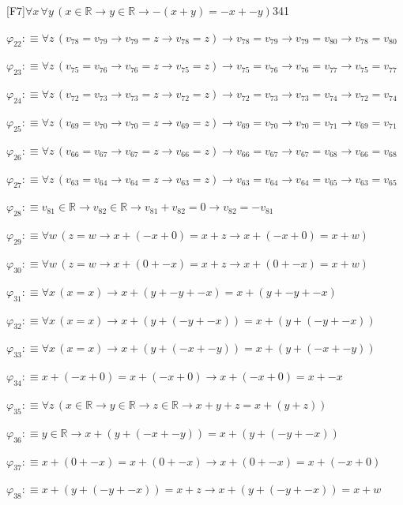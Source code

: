 \begin{fullproof}{[F7]}{$\forall x\,\forall y\,(x \in \mathbb{R} \to y \in \mathbb{R} \to -(x + y) = -x + -y)$}{341}
\begin{abbrevlist}
\item $\varphi_{22} :\equiv \forall z\,(v_{78} = v_{79} \to v_{79} = z \to v_{78} = z) \to v_{78} = v_{79} \to v_{79} = v_{80} \to v_{78} = v_{80}$
\item $\varphi_{23} :\equiv \forall z\,(v_{75} = v_{76} \to v_{76} = z \to v_{75} = z) \to v_{75} = v_{76} \to v_{76} = v_{77} \to v_{75} = v_{77}$
\item $\varphi_{24} :\equiv \forall z\,(v_{72} = v_{73} \to v_{73} = z \to v_{72} = z) \to v_{72} = v_{73} \to v_{73} = v_{74} \to v_{72} = v_{74}$
\item $\varphi_{25} :\equiv \forall z\,(v_{69} = v_{70} \to v_{70} = z \to v_{69} = z) \to v_{69} = v_{70} \to v_{70} = v_{71} \to v_{69} = v_{71}$
\item $\varphi_{26} :\equiv \forall z\,(v_{66} = v_{67} \to v_{67} = z \to v_{66} = z) \to v_{66} = v_{67} \to v_{67} = v_{68} \to v_{66} = v_{68}$
\item $\varphi_{27} :\equiv \forall z\,(v_{63} = v_{64} \to v_{64} = z \to v_{63} = z) \to v_{63} = v_{64} \to v_{64} = v_{65} \to v_{63} = v_{65}$
\item $\varphi_{28} :\equiv v_{81} \in \mathbb{R} \to v_{82} \in \mathbb{R} \to v_{81} + v_{82} = 0 \to v_{82} = -v_{81}$
\item $\varphi_{29} :\equiv \forall w\,(z = w \to x + (-x + 0) = x + z \to x + (-x + 0) = x + w)$
\item $\varphi_{30} :\equiv \forall w\,(z = w \to x + (0 + -x) = x + z \to x + (0 + -x) = x + w)$
\item $\varphi_{31} :\equiv \forall x\,(x = x) \to x + (y + -y + -x) = x + (y + -y + -x)$
\item $\varphi_{32} :\equiv \forall x\,(x = x) \to x + (y + (-y + -x)) = x + (y + (-y + -x))$
\item $\varphi_{33} :\equiv \forall x\,(x = x) \to x + (y + (-x + -y)) = x + (y + (-x + -y))$
\item $\varphi_{34} :\equiv x + (-x + 0) = x + (-x + 0) \to x + (-x + 0) = x + -x$
\item $\varphi_{35} :\equiv \forall z\,(x \in \mathbb{R} \to y \in \mathbb{R} \to z \in \mathbb{R} \to x + y + z = x + (y + z))$
\item $\varphi_{36} :\equiv y \in \mathbb{R} \to x + (y + (-x + -y)) = x + (y + (-y + -x))$
\item $\varphi_{37} :\equiv x + (0 + -x) = x + (0 + -x) \to x + (0 + -x) = x + (-x + 0)$
\item $\varphi_{38} :\equiv x + (y + (-y + -x)) = x + z \to x + (y + (-y + -x)) = x + w$

\end{abbrevlist}
\end{fullproof}
